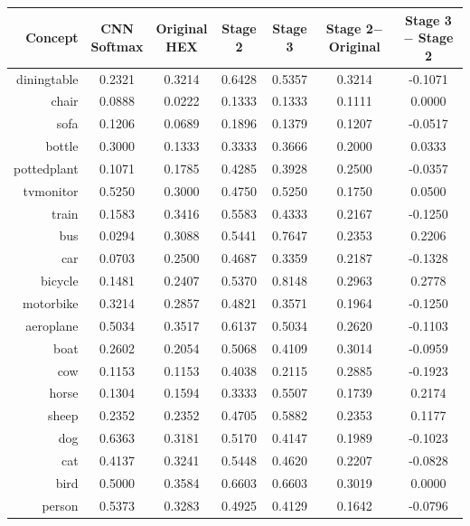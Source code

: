 \documentclass[11pt,a4paper]{article}
\begin{document}
\begin{table}[htbp]
\centering
\begin{tabular}{r|c|c|c|c|c|c}
Concept & \makecell{CNN\\Softmax} & \makecell{Original\\HEX} & Stage 2 & Stage 3 & \makecell{Stage 2$-$\\Original} & \makecell{Stage 3$-$\\Stage 2}\\\hline
diningtable   & 0.2321 & 0.3214 & 0.6428 & 0.5357 & 0.3214 & -0.1071\\
chair         & 0.0888 & 0.0222 & 0.1333 & 0.1333 & 0.1111 & 0.0000\\
sofa          & 0.1206 & 0.0689 & 0.1896 & 0.1379 & 0.1207 & -0.0517\\
bottle        & 0.3000 & 0.1333 & 0.3333 & 0.3666 & 0.2000 & 0.0333\\
pottedplant   & 0.1071 & 0.1785 & 0.4285 & 0.3928 & 0.2500 & -0.0357\\
tvmonitor     & 0.5250 & 0.3000 & 0.4750 & 0.5250 & 0.1750 & 0.0500\\
train         & 0.1583 & 0.3416 & 0.5583 & 0.4333 & 0.2167 & -0.1250\\
bus           & 0.0294 & 0.3088 & 0.5441 & 0.7647 & 0.2353 & 0.2206\\
car           & 0.0703 & 0.2500 & 0.4687 & 0.3359 & 0.2187 & -0.1328\\
bicycle       & 0.1481 & 0.2407 & 0.5370 & 0.8148 & 0.2963 & 0.2778\\
motorbike     & 0.3214 & 0.2857 & 0.4821 & 0.3571 & 0.1964 & -0.1250\\
aeroplane     & 0.5034 & 0.3517 & 0.6137 & 0.5034 & 0.2620 & -0.1103\\
boat          & 0.2602 & 0.2054 & 0.5068 & 0.4109 & 0.3014 & -0.0959\\
cow           & 0.1153 & 0.1153 & 0.4038 & 0.2115 & 0.2885 & -0.1923\\
horse         & 0.1304 & 0.1594 & 0.3333 & 0.5507 & 0.1739 & 0.2174\\
sheep         & 0.2352 & 0.2352 & 0.4705 & 0.5882 & 0.2353 & 0.1177\\
dog           & 0.6363 & 0.3181 & 0.5170 & 0.4147 & 0.1989 & -0.1023\\
cat           & 0.4137 & 0.3241 & 0.5448 & 0.4620 & 0.2207 & -0.0828\\
bird          & 0.5000 & 0.3584 & 0.6603 & 0.6603 & 0.3019 & 0.0000\\
person        & 0.5373 & 0.3283 & 0.4925 & 0.4129 & 0.1642 & -0.0796\\\hline

\end{tabular}
\end{table}
\end{document}
